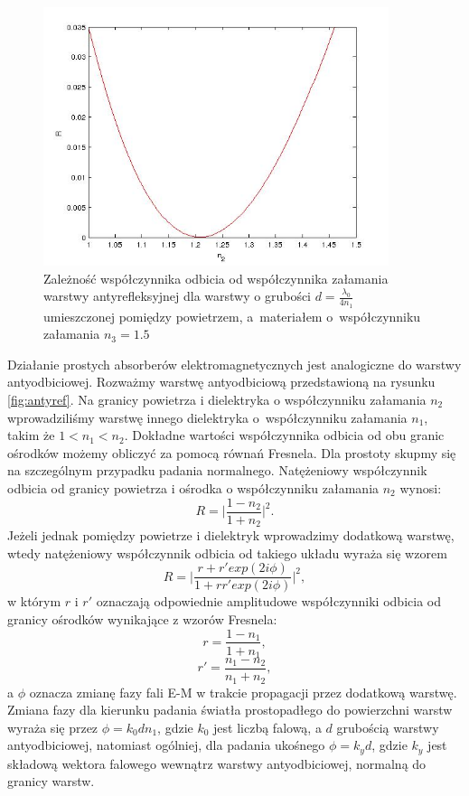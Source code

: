 \begin{figure}[htb]
	\centering
	\includegraphics[width=0.9\textwidth]{images/antyref.jpg}
	\caption{Zależność współczynnika odbicia od współczynnika załamania warstwy antyrefleksyjnej dla warstwy o grubości $d=\frac{\lambda_0}{4 n_1}$ umieszczonej pomiędzy powietrzem, a~materiałem o~współczynniku załamania $n_3=1.5$}
	\label{fig:antyref-result}
\end{figure}


Działanie prostych absorberów elektromagnetycznych jest analogiczne do warstwy antyodbiciowej. Rozważmy   warstwę antyodbiciową przedstawioną na rysunku \ref{fig:antyref}. Na granicy powietrza i dielektryka o współczynniku załamania $n_2$ wprowadziliśmy warstwę innego dielektryka o~współczynniku załamania $n_1$, takim że $1<n_1<n_2$. Dokładne wartości współczynnika odbicia od obu granic ośrodków możemy obliczyć za pomocą równań Fresnela. Dla prostoty skupmy się na szczególnym przypadku padania normalnego. Natężeniowy współczynnik odbicia od granicy powietrza i ośrodka o współczynniku załamania $n_2$ wynosi:
\begin{equation}
R=\bigg|\frac{1-n_2}{1+n_2}\bigg|^2.
\end{equation}
Jeżeli jednak pomiędzy powietrze i dielektryk wprowadzimy dodatkową warstwę, wtedy natężeniowy współczynnik odbicia od takiego układu wyraża się wzorem
\begin{equation}
R=\Bigg| \frac{r+r' exp(2 i\phi)}{1+r r' exp(2 i\phi)} \Bigg|^2,
\end{equation}
w którym $r$ i $r'$ oznaczają odpowiednie amplitudowe współczynniki odbicia od granicy ośrodków wynikające z wzorów Fresnela:
\begin{equation}
r=\frac{1-n_1}{1+n_1},
\end{equation}
\begin{equation}
r'=\frac{n_1-n_2}{n_1+n_2},
\end{equation}
a $\phi$ oznacza zmianę fazy fali E-M w trakcie propagacji przez dodatkową warstwę. Zmiana fazy dla kierunku padania światła prostopadłego do powierzchni warstw wyraża się przez $\phi=k_0 d n_1$, gdzie $k_0$ jest liczbą falową, a $d$ grubością warstwy antyodbiciowej, natomiast ogólniej, dla padania ukośnego $\phi=k_y d$, gdzie $k_y$ jest składową wektora falowego wewnątrz warstwy antyodbiciowej, normalną do granicy warstw. 

